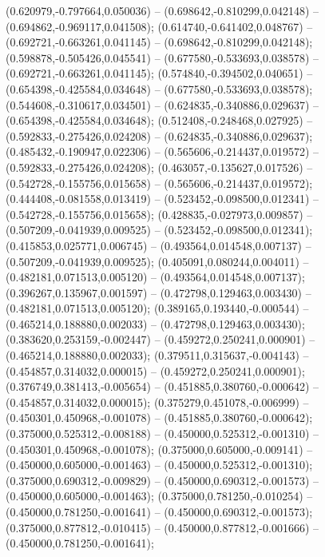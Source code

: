  (0.620979,-0.797664,0.050036) -- (0.698642,-0.810299,0.042148) -- (0.694862,-0.969117,0.041508);
 (0.614740,-0.641402,0.048767) -- (0.692721,-0.663261,0.041145) -- (0.698642,-0.810299,0.042148);
 (0.598878,-0.505426,0.045541) -- (0.677580,-0.533693,0.038578) -- (0.692721,-0.663261,0.041145);
 (0.574840,-0.394502,0.040651) -- (0.654398,-0.425584,0.034648) -- (0.677580,-0.533693,0.038578);
 (0.544608,-0.310617,0.034501) -- (0.624835,-0.340886,0.029637) -- (0.654398,-0.425584,0.034648);
 (0.512408,-0.248468,0.027925) -- (0.592833,-0.275426,0.024208) -- (0.624835,-0.340886,0.029637);
 (0.485432,-0.190947,0.022306) -- (0.565606,-0.214437,0.019572) -- (0.592833,-0.275426,0.024208);
 (0.463057,-0.135627,0.017526) -- (0.542728,-0.155756,0.015658) -- (0.565606,-0.214437,0.019572);
 (0.444408,-0.081558,0.013419) -- (0.523452,-0.098500,0.012341) -- (0.542728,-0.155756,0.015658);
 (0.428835,-0.027973,0.009857) -- (0.507209,-0.041939,0.009525) -- (0.523452,-0.098500,0.012341);
 (0.415853,0.025771,0.006745) -- (0.493564,0.014548,0.007137) -- (0.507209,-0.041939,0.009525);
 (0.405091,0.080244,0.004011) -- (0.482181,0.071513,0.005120) -- (0.493564,0.014548,0.007137);
 (0.396267,0.135967,0.001597) -- (0.472798,0.129463,0.003430) -- (0.482181,0.071513,0.005120);
 (0.389165,0.193440,-0.000544) -- (0.465214,0.188880,0.002033) -- (0.472798,0.129463,0.003430);
 (0.383620,0.253159,-0.002447) -- (0.459272,0.250241,0.000901) -- (0.465214,0.188880,0.002033);
 (0.379511,0.315637,-0.004143) -- (0.454857,0.314032,0.000015) -- (0.459272,0.250241,0.000901);
 (0.376749,0.381413,-0.005654) -- (0.451885,0.380760,-0.000642) -- (0.454857,0.314032,0.000015);
 (0.375279,0.451078,-0.006999) -- (0.450301,0.450968,-0.001078) -- (0.451885,0.380760,-0.000642);
 (0.375000,0.525312,-0.008188) -- (0.450000,0.525312,-0.001310) -- (0.450301,0.450968,-0.001078);
 (0.375000,0.605000,-0.009141) -- (0.450000,0.605000,-0.001463) -- (0.450000,0.525312,-0.001310);
 (0.375000,0.690312,-0.009829) -- (0.450000,0.690312,-0.001573) -- (0.450000,0.605000,-0.001463);
 (0.375000,0.781250,-0.010254) -- (0.450000,0.781250,-0.001641) -- (0.450000,0.690312,-0.001573);
 (0.375000,0.877812,-0.010415) -- (0.450000,0.877812,-0.001666) -- (0.450000,0.781250,-0.001641);
